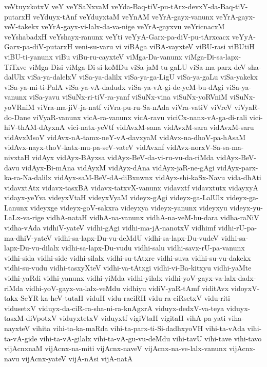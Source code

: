 {veVtuyxkotxV
veY
veYSaNxvaM
veYda-Baq-tiV-pu-tArx-devxY-da-Baq-tiV-putarxH
veYduyx-tAnf
veYduyxtaM
veYnAM
veYrA-gayx-vanunx
veYrA-gayx-veV-takekx
veYrA-gayx-vi-lalx-da-va-nige
veYrA-gayxvu
veYricnacxM
veYshabadxH
veYshayx-ranunx
veYti
veYyA-Garx-pa-diV-pu-tArxcacx
veYyA-Garx-pa-diV-putarxH
veni-su-varu
vi
viBAga
viBA-vayxteV
viBU-rasi
viBUtiH
viBU-ti-yanunx
viBu
viBu-ru-cayxteV
viMga-Da-vanunx
viMga-Di-sa-lapx-TiTxve
viMga-Disi
viMga-Di-si-koMDu
viSa-jaM-tu-gaLU
viSa-ma-parx-deV-sha-dalUlx
viSa-ya-dalelxV
viSa-ya-dalilx
viSa-ya-ga-LigU
viSa-ya-gaLu
viSa-yakekx
viSa-ya-mi-ti-PalA
viSa-ya-vA-dadudx
viSa-ya-vA-gi-de-yeM-bu-dAgi
viSa-ya-vanunx
viSa-yavu
viSuNx-ri-tiV-ra-yanf
viSuNx-vina
viSuNx-yoRVniM
viSuNx-yoVRniM
viVra-ma-jiV-ja-natf
viVra-pu-ru-Sa-nAda
viVra-vatiV
viVreV
viVyaR-do-Dane
viVyaR-vanunx
vicA-ra-vanunx
vicA-ravu
viciCx-nanx-vA-ga-di-rali
vici-hiV-thAM-dAyxnA
vici-natx-yeVtf
vidAvxM-sana
vidAvxM-sara
vidAvxM-saru
vidAvxMsoV
vidAvx-nA-tamx-neY-vA-davxyaM
vidAvx-na-dhoV-pa-hAsaM
vidAvx-nayx-thoV-katx-mu-pa-seV-vateV
vidAvxnf
vidAvx-norxV-Sa-sa-ma-nivxtaH
vidAyx
vidAyx-BAyxsa
vidAyx-BeV-da-vi-ru-vu-da-riMda
vidAyx-BeV-davu
vidAyx-Bi-mAna
vidAyxM
vidAyx-dAna
vidAyx-jaR-ne-gAgi
vidAyx-parx-ka-ra-Na-dalilx
vidAyx-saM-BeV-dA-diBxnwnx
vidAyx-shi-kaSx-Navu
vida-dhAti
vidavxtAtx
vidavx-tasxBA
vidavx-tatxvX-vanunx
vidavxtf
vidavxtutx
vidayxyA
vidayx-yeYva
videyxVtaH
videyxVyaM
videyx-gAgi
videyx-ga-LalUlx
videyx-ga-Lanunx
videyxge
videyx-goV-sakxra
videyxya
videyx-yanunx
videyxyu
videyx-yu-LaLx-va-rige
vidhA-nataH
vidhA-na-vanunx
vidhA-na-veM-bu-dara
vidha-raNiV
vidha-vAda
vidhiV-yateV
vidhi-gAgi
vidhi-ma-jA-nanotxV
vidhimf
vidhi-rU-pa-ma-dhiV-yateV
vidhi-sa-lapx-Du-vu-deMdU
vidhi-sa-lapx-Du-vudeV
vidhi-sa-lapx-Du-vu-dilalx
vidhi-sa-lapx-Du-vudu
vidhi-salu
vidhi-savx-rU-pa-vanunx
vidhi-sida
vidhi-side
vidhi-silalx
vidhi-su-tAtxre
vidhi-suva
vidhi-su-vu-dakekx
vidhi-su-vudu
vidhi-tasxyXteV
vidhi-va-tAtxgi
vidhi-vi-Ba-kitxyu
vidhi-yaMte
vidhi-yaRdi
vidhi-yanunx
vidhi-yiMda
vidhi-yilalx
vidhi-yoV-gayx-va-lalx-dadx-riMda
vidhi-yoV-gayx-va-lalx-veMdu
vidhiyu
vidiV-yaR-tAmf
viditAvx
vidoyxV-takx-SeYR-ka-heV-tutaH
viduH
vidu-raciRH
vidu-ra-ciRsetxV
vidu-riti
vidusetxV
viduyx-da-ciR-ra-sha-ni-ra-knAgxrA
viduyx-dedxV-va-teya
viduyx-tasxM-diVpotxV
viduyxtetxV
viduyxtf
vigiVtaH
vigitaH
vihA-pa-yati
viha-nayxteV
vihita
vihi-ta-ka-maRda
vihi-ta-parx-ti-Si-dadhxyoVH
vihi-ta-vAda
vihi-ta-vA-gide
vihi-ta-vA-gilalx
vihi-ta-vA-gu-vu-deMdu
vihi-tavU
vihi-tave
vihi-tavo
vijAcnxnaM
vijAcnx-na-miti
vijAcnx-naveV
vijAcnx-na-ve-lalx-vanunx
vijAcnx-navu
vijAcnx-yateV
vijA-nAsi
vijA-natA
}
